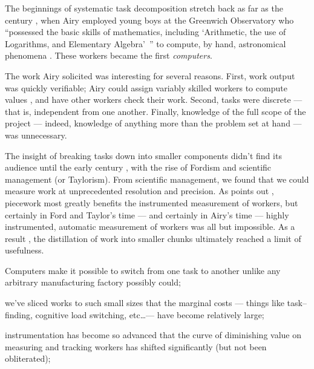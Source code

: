 \documentclass[trackingWork]{subfiles}
\begin{document}
\subsubsubsection{\pieceworkpers}
The beginnings of
systematic task decomposition
stretch back as far as the  century%
, when Airy employed young boys at the Greenwich Observatory who
``possessed the basic skills of mathematics, including
`Arithmetic, the use of Logarithms, and Elementary Algebra'~''
to compute, by hand, astronomical phenomena
\cite{grier2013computers}.
These workers became the first \textit{computers}.

The work Airy solicited was interesting for several reasons.
First, work output was quickly verifiable;
Airy could assign variably skilled workers to compute values%
, and have other workers check their work.
Second, tasks were discrete --- that is, independent from one another.
Finally, knowledge of the full scope of the project
--- indeed, knowledge of anything more than the problem set at hand ---
was unnecessary.

The insight of breaking tasks down into smaller components didn't find its audience until
the early  century%
, with the rise of Fordism and scientific management (or Taylorism).
From scientific management, we found that
we could measure work at unprecedented resolution and precision.
As \citeauthor{Brown01041990} points out%
, piecework most greatly benefits the instrumented measurement of workers, but certainly
in Ford and Taylor's time --- and certainly in Airy's time ---
highly instrumented, automatic measurement of workers was all but impossible.
As a result%
, the distillation of work into smaller chunks
ultimately reached a limit of usefulness.



\subsubsubsection{\whatchanged}
\begin{inlinelist}
  \item Computers make it possible to switch from one task to another
  unlike any arbitrary manufacturing factory possibly could;
  \item we've sliced works to such small sizes that the marginal costs
  --- things like task--finding, cognitive load switching, etc\dots ---
  have become relatively large;
  \item instrumentation has become so advanced that
  the curve of diminishing value on measuring and tracking workers has shifted significantly
  (but not been obliterated);
\end{inlinelist}
\end{document}
